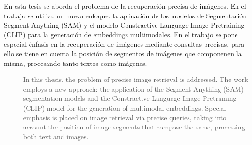 \begin{resumen}
	En esta tesis se aborda el problema de la recuperación precisa de imágenes. En el trabajo se utiliza un nuevo enfoque: la aplicación de los modelos de Segmentación Segment Anything (SAM) y el  modelo Constractive Language-Image Pretraining (CLIP) para la generación de embeddings multimodales. En el trabajo se pone especial énfasis en la recuperación de  imágenes mediante consultas precisas, para ello se tiene en cuenta la posición de segmentos de imágenes que componenen la misma, procesando tanto textos como imágenes.
	\end{resumen}
	
	\begin{abstract}
		In this thesis, the problem of precise image retrieval is addressed. The work employs a new approach: the application of the Segment Anything (SAM) segmentation models and the Constractive Language-Image Pretraining (CLIP) model for the generation of multimodal embeddings. Special emphasis is placed on image retrieval via precise queries, taking into account the position of image segments that compose the same, processing both text and images.
	\end{abstract}